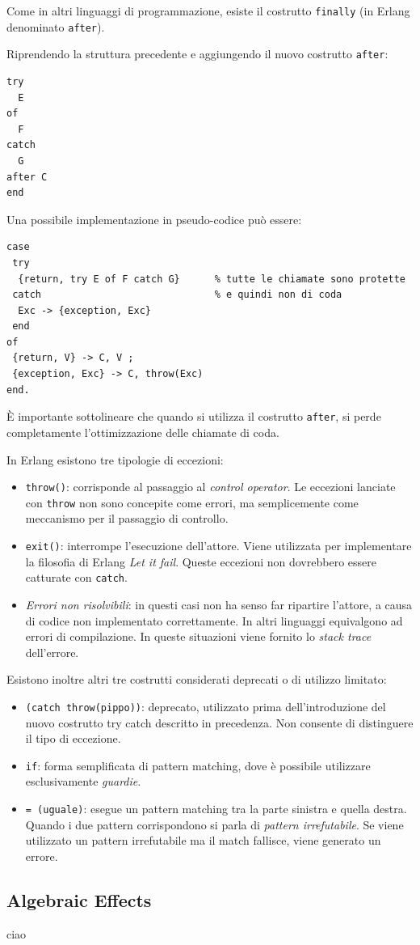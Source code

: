 \documentclass{article}
\begin{document}
Come in altri linguaggi di programmazione, esiste il costrutto \texttt{finally} (in Erlang denominato \texttt{after}).

Riprendendo la struttura precedente e aggiungendo il nuovo costrutto \texttt{after}:
\begin{tcolorbox}
\begin{verbatim}
try
  E
of
  F
catch
  G
after C
end
\end{verbatim}
\end{tcolorbox}
\vspace{8pt}
Una possibile implementazione in pseudo-codice può essere:
\begin{tcolorbox}
\begin{verbatim}
case
 try
  {return, try E of F catch G}      % tutte le chiamate sono protette
 catch                              % e quindi non di coda
  Exc -> {exception, Exc}
 end
of
 {return, V} -> C, V ;
 {exception, Exc} -> C, throw(Exc)
end.
\end{verbatim}
\end{tcolorbox}
\vspace{8pt}
È importante sottolineare che quando si utilizza il costrutto \texttt{after}, si perde completamente l'ottimizzazione delle chiamate di coda.

\pagebreak

In Erlang esistono tre tipologie di eccezioni:
\begin{itemize}
    \item \texttt{throw()}: corrisponde al passaggio al \textit{control operator}. Le eccezioni lanciate con \texttt{throw} non sono concepite come errori, ma semplicemente come meccanismo per il passaggio di controllo.
    \item \texttt{exit()}: interrompe l'esecuzione dell'attore. Viene utilizzata per implementare la filosofia di Erlang \textit{Let it fail}. Queste eccezioni non dovrebbero essere catturate con \texttt{catch}.
    \item \textit{Errori non risolvibili}: in questi casi non ha senso far ripartire l'attore, a causa di codice non implementato correttamente. In altri linguaggi equivalgono ad errori di compilazione. In queste situazioni viene fornito lo \textit{stack trace} dell'errore.
\end{itemize}
\vspace{8pt}
Esistono inoltre altri tre costrutti considerati deprecati o di utilizzo limitato:
\begin{itemize}
    \item \texttt{(catch throw(pippo))}: deprecato, utilizzato prima dell'introduzione del nuovo costrutto try catch descritto in precedenza. Non consente di distinguere il tipo di eccezione.
    \item \texttt{if}: forma semplificata di pattern matching, dove è possibile utilizzare esclusivamente \textit{guardie}.
    \item \texttt{= (uguale)}: esegue un pattern matching tra la parte sinistra e quella destra. Quando i due pattern corrispondono si parla di \textit{pattern irrefutabile}. Se viene utilizzato un pattern irrefutabile ma il match fallisce, viene generato un errore.
\end{itemize}

\subsection*{Algebraic Effects}
ciao
\end{document}
